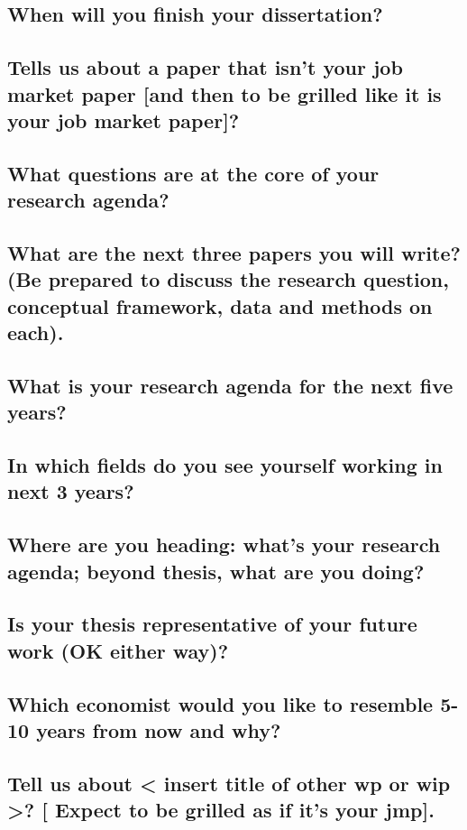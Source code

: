 \documentclass[12pt]{article}
\theoremstyle{plain}
\theoremstyle{plain}
\theoremstyle{plain}
\theoremstyle{plain}
\theoremstyle{plain}
\theoremstyle{plain}
\begin{document}
\subsection{When will you finish your dissertation?}
\label{sec:orgfe27806}
\subsection{Tells us about a paper that isn't your job market paper [and then to be grilled like it is your job market paper]?}
\label{sec:org06ae3c9}
\subsection{What questions are at the core of your research agenda?}
\label{sec:org807425a}
\subsection{What are the next three papers you will write? (Be prepared to discuss the research question, conceptual framework, data and methods on each).}
\label{sec:orgd4b1f59}
\subsection{What is your research agenda for the next five years?}
\label{sec:orgcf192a3}
\subsection{In which fields do you see yourself working in next 3 years?}
\label{sec:org7a09058}
\subsection{Where are you heading: what's your research agenda; beyond thesis, what are you doing?}
\label{sec:org560c862}
\subsection{Is your thesis representative of your future work (OK either way)?}
\label{sec:org3dbf868}
\subsection{Which economist would you like to resemble 5-10 years from now and why?}
\label{sec:org19d92ed}
\subsection{Tell us about < insert title of other wp or wip >? [ Expect to be grilled as if it's your jmp].}
\label{sec:org400f401}
\end{document}
